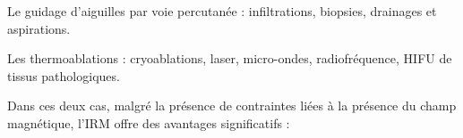 
\begin{description}
\item  Le guidage d’aiguilles par voie percutanée : infiltrations, biopsies, drainages et aspirations.
\item Les thermoablations : cryoablations, laser, micro-ondes, radiofréquence, \ac{HIFU} de tissus pathologiques.
\end{description}



Dans ces deux cas, malgré la présence de contraintes liées à la présence du champ magnétique, l’IRM offre des avantages significatifs :\\
